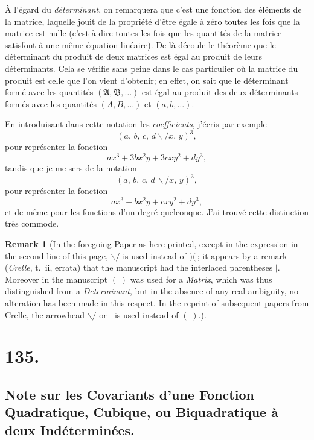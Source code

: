 \documentclass[11pt,a4paper]{article}
\theoremstyle{definition}
\newtheorem*{remark}{Remark}
\begin{document}
\medskip

\`A l'\'egard du \textit{d\'eterminant}, on remarquera que c'est une
fonction des \'el\'ements de la matrice, laquelle jouit de la propri\'et\'e
d'\^etre \'egale \`a z\'ero toutes les fois que la matrice est nulle (c'est-\`a-dire
toutes les fois que les quantit\'es de la matrice satisfont \`a une m\^eme
\'equation lin\'eaire). De l\`a d\'ecoule le th\'eor\`eme que le d\'eterminant
du produit de deux matrices est \'egal au produit de leurs d\'eterminants.
Cela se v\'erifie sans peine dans le cas particulier o\`u la matrice du
produit est celle que l'on vient d'obtenir; en effet, on sait que le
d\'eterminant form\'e avec les quantit\'es $(\mathfrak{A},\mathfrak{B},\ldots)$
est \'egal au produit des deux d\'eterminants form\'es avec les quantit\'es
$(A, B,\ldots)$ et $(a, b,\ldots)$.

\medskip

En introduisant dans cette notation les \textit{coefficients}, j'\'ecris
par exemple
\[
(a,\, b,\, c,\, d\!\!\backslash\!\!\!/ x,\, y)^3,
\]
pour repr\'esenter la fonction
\[
ax^3 + 3bx^2y + 3cxy^2 + dy^3,
\]
tandis que je me sers de la notation
\[
(a,\, b,\, c,\, d\,\backslash\!\!\!/ x,\, y)^3,
\]
pour repr\'esenter la fonction
\[
ax^3 + bx^2y + cxy^2 + dy^3,
\]
et de m\^eme pour les fonctions d'un degr\'e quelconque. J'ai trouv\'e cette
distinction tr\`es commode.

\begin{remark}
[In the foregoing Paper as here printed, except in the expression in the
second line of this page, $\backslash\!\!\!/$ is used instead of $)(\,$;
it appears by a remark (\textit{Crelle}, t.~ii, errata) that the
manuscript had the interlaced parentheses $\mid$. Moreover in the
manuscript $(\;)$ was used for a \textit{Matrix}, which was thus
distinguished from a \textit{Determinant}, but in the absence of any real
ambiguity, no alteration has been made in this respect. In the reprint of
subsequent papers from Crelle, the arrowhead $\backslash\!\!\!/$ or
$\mid$ is used instead of $(\;)$.]
\end{remark}

\newpage
\section*{135.}
\subsection*{Note sur les Covariants d'une Fonction Quadratique, Cubique, ou Biquadratique \`a deux Ind\'etermin\'ees.}
\end{document}
